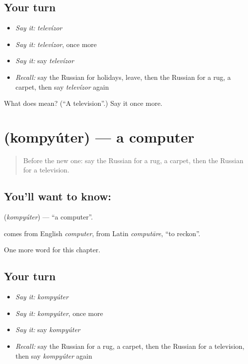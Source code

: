 \subsection*{Your turn}
\begin{itemize}
\raggedright
  \item \emph{Say it:} \emph{televízor}
  \item \emph{Say it:} \emph{televízor}, once more
  \item \emph{Say it:} say \emph{televízor}
  \item \emph{Recall:} say the Russian for holidays, leave, then the Russian for a rug, a carpet, then say \emph{televízor} again
\end{itemize}

\begin{tcolorbox}[breakable,colback=teal!4,colframe=teal!35!black,title={Before you move on}]
What does  mean? (\textquotedblleft{}A television\textquotedblright{}.) Say it once more.
\end{tcolorbox}
\section[\texorpdfstring{\ru{компьютер} (kompyúter)}{компьютер (kompyúter)}]{ (kompyúter) — a computer}

\label{lesson:RU-C94-computer}



\begin{quote}
Before the new one: say the Russian for a rug, a carpet, then the Russian for a television.
\end{quote}

\subsection*{You'll want to know: }
\textbf{} (\emph{kompyúter}) — \textquotedblleft{}a computer\textquotedblright{}.

\begin{cousinweb}
\textbf{} comes from English \emph{computer}, from Latin \emph{computāre}, \textquotedblleft{}to reckon\textquotedblright{}.
\end{cousinweb}

\begin{grammarlens}[title={What you've built}]
One more word for this chapter.
\end{grammarlens}

\subsection*{Your turn}
\begin{itemize}
\raggedright
  \item \emph{Say it:} \emph{kompyúter}
  \item \emph{Say it:} \emph{kompyúter}, once more
  \item \emph{Say it:} say \emph{kompyúter}
  \item \emph{Recall:} say the Russian for a rug, a carpet, then the Russian for a television, then say \emph{kompyúter} again
\end{itemize}

